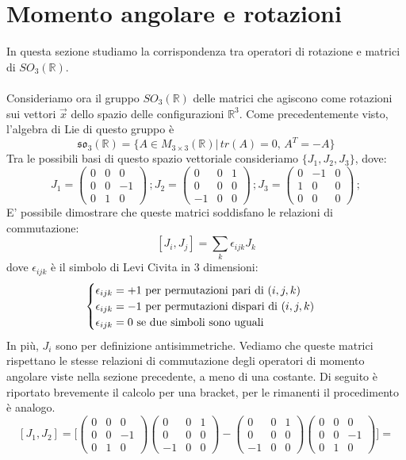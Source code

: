 \documentclass[12pt,a4paper]{report}
\theoremstyle{definition}
\theoremstyle{Theorem}
\theoremstyle{definition}
\theoremstyle{definition}
\theoremstyle{definition}
\begin{document}
\section{Momento angolare e rotazioni}
In questa sezione studiamo la corrispondenza tra operatori di rotazione e matrici di $SO_3(\mathbb{R})$.\\
\\
Consideriamo ora il gruppo $SO_3(\mathbb{R})$ delle matrici che agiscono come rotazioni sui vettori  $\vec{x}$ dello spazio delle configurazioni $\mathbb{R}^3$. Come precedentemente visto, l'algebra di Lie di questo gruppo è
$$\mathfrak{so_3}(\mathbb{R})=\{A\in M_{3\times 3}(\mathbb{R})|\, tr(A)=0,\, A^T=-A\}$$
Tra le possibili basi di questo spazio vettoriale consideriamo $\{J_1,J_2,J_3\}$, dove:
$$
J_1=
\begin{pmatrix}
	0 &0&0\\
	0 &0&-1\\
	0 &1&0
\end{pmatrix} \, ;
J_2=
\begin{pmatrix}
	0 &0&1\\
	0 &0&0\\
	-1 &0&0
\end{pmatrix} \, ;
J_3=
\begin{pmatrix}
	0 &-1&0\\
	1 &0&0\\
	0 &0&0
\end{pmatrix} \, ;
$$
E' possibile dimostrare che queste matrici soddisfano le relazioni di commutazione:
$$[J_i,J_j]=\sum_{k}\epsilon_{ijk}J_k$$
dove $\epsilon_{ijk}$ è il simbolo di Levi Civita in 3 dimensioni: 
\begin{equation}
	\begin{cases}
		\epsilon_{ijk}=+1$ per permutazioni pari di $(i,j,k)\\
		\epsilon_{ijk}=-1 $ per permutazioni dispari di $(i,j,k)\\
		\epsilon_{ijk}=0$ se due simboli sono uguali$
	\end{cases}
\end{equation}
In più, $J_i$ sono per definizione antisimmetriche.
Vediamo che queste matrici rispettano le stesse relazioni di commutazione degli operatori di momento angolare viste nella sezione precedente, a meno di una costante. Di seguito è riportato brevemente il calcolo per una bracket, per le rimanenti il procedimento è analogo.
$$[J_1,J_2]=\bigg[
\begin{pmatrix}
	0 &0&0\\
	0 &0&-1\\
	0 &1&0
\end{pmatrix}
\begin{pmatrix}
	0 &0&1\\
	0 &0&0\\
	-1 &0&0
\end{pmatrix}
-
\begin{pmatrix}
	0 &0&1\\
	0 &0&0\\
	-1 &0&0
\end{pmatrix}
\begin{pmatrix}
	0 &0&0\\
	0 &0&-1\\
	0 &1&0
\end{pmatrix}
\bigg]=$$
\end{document}
